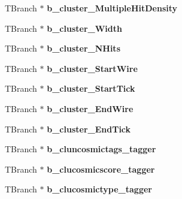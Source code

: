 \begin{DoxyCompactItemize}
\item 
\hypertarget{classanatree_a3ad1ce127e92e536189b2614477a49c5}{T\-Branch $\ast$ {\bfseries b\-\_\-cluster\-\_\-\-Multiple\-Hit\-Density}}\label{classanatree_a3ad1ce127e92e536189b2614477a49c5}

\item 
\hypertarget{classanatree_a7a61097f1417a99882831d6bbe533b2a}{T\-Branch $\ast$ {\bfseries b\-\_\-cluster\-\_\-\-Width}}\label{classanatree_a7a61097f1417a99882831d6bbe533b2a}

\item 
\hypertarget{classanatree_a0689fef71e05e95cb2ddb854c5201995}{T\-Branch $\ast$ {\bfseries b\-\_\-cluster\-\_\-\-N\-Hits}}\label{classanatree_a0689fef71e05e95cb2ddb854c5201995}

\item 
\hypertarget{classanatree_aeec86e185d9e0bc3163fc88cdb6019da}{T\-Branch $\ast$ {\bfseries b\-\_\-cluster\-\_\-\-Start\-Wire}}\label{classanatree_aeec86e185d9e0bc3163fc88cdb6019da}

\item 
\hypertarget{classanatree_a5be78fd80b6792d715e6214a52a7daac}{T\-Branch $\ast$ {\bfseries b\-\_\-cluster\-\_\-\-Start\-Tick}}\label{classanatree_a5be78fd80b6792d715e6214a52a7daac}

\item 
\hypertarget{classanatree_aac8d0d8d9cb33a643c3dab8c288b359e}{T\-Branch $\ast$ {\bfseries b\-\_\-cluster\-\_\-\-End\-Wire}}\label{classanatree_aac8d0d8d9cb33a643c3dab8c288b359e}

\item 
\hypertarget{classanatree_ab16577aff6679ce7ae82fa9a4adbc9c7}{T\-Branch $\ast$ {\bfseries b\-\_\-cluster\-\_\-\-End\-Tick}}\label{classanatree_ab16577aff6679ce7ae82fa9a4adbc9c7}

\item 
\hypertarget{classanatree_abe945439379a574fc5b69fc4ee2453ed}{T\-Branch $\ast$ {\bfseries b\-\_\-cluncosmictags\-\_\-tagger}}\label{classanatree_abe945439379a574fc5b69fc4ee2453ed}

\item 
\hypertarget{classanatree_a6b67c908760fa144f00052e85231ea2f}{T\-Branch $\ast$ {\bfseries b\-\_\-clucosmicscore\-\_\-tagger}}\label{classanatree_a6b67c908760fa144f00052e85231ea2f}

\item 
\hypertarget{classanatree_a6275dc9d3c86fdf0c9dbafb7671b422b}{T\-Branch $\ast$ {\bfseries b\-\_\-clucosmictype\-\_\-tagger}}\label{classanatree_a6275dc9d3c86fdf0c9dbafb7671b422b}


\end{DoxyCompactItemize}
